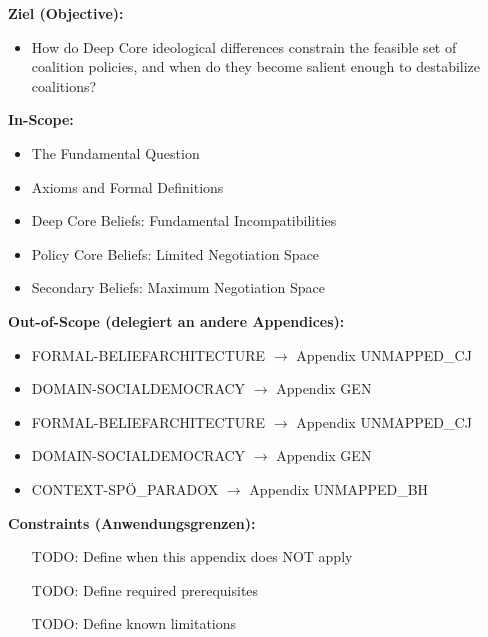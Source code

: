 

\begin{tcolorbox}[
    colback=orange!5!white,
    colframe=orange!75!black,
    title={\textbf{Appendix Scope: Ziel / In-Scope / Out-of-Scope / Constraints}},
    fonttitle=\bfseries
]

\textbf{Ziel (Objective):}
\begin{itemize}[nosep]
    \item How do Deep Core ideological differences constrain the feasible set of coalition policies, and when do they become salient enough to destabilize coalitions?
\end{itemize}

\textbf{In-Scope:}
\begin{itemize}[nosep]
    \item The Fundamental Question
    \item Axioms and Formal Definitions
    \item Deep Core Beliefs: Fundamental Incompatibilities
    \item Policy Core Beliefs: Limited Negotiation Space
    \item Secondary Beliefs: Maximum Negotiation Space
\end{itemize}

\textbf{Out-of-Scope (delegiert an andere Appendices):}
\begin{itemize}[nosep]
    \item FORMAL-BELIEFARCHITECTURE $\rightarrow$ Appendix UNMAPPED_CJ
    \item DOMAIN-SOCIALDEMOCRACY $\rightarrow$ Appendix GEN
    \item FORMAL-BELIEFARCHITECTURE $\rightarrow$ Appendix UNMAPPED_CJ
    \item DOMAIN-SOCIALDEMOCRACY $\rightarrow$ Appendix GEN
    \item CONTEXT-SPÖ_PARADOX $\rightarrow$ Appendix UNMAPPED_BH
\end{itemize}

\textbf{Constraints (Anwendungsgrenzen):}
\begin{itemize}[nosep]
    \item [TODO: Define when this appendix does NOT apply]
    \item [TODO: Define required prerequisites]
    \item [TODO: Define known limitations]
\end{itemize}


\end{tcolorbox}

